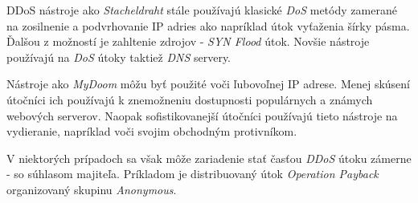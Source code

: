 \documentclass[
  digital, %
  table,   %
  lof,     %
  nolot,   %
  nocover
]{fithesis3}
\begin{document}
DDoS nástroje ako \textit{Stacheldraht} stále používajú klasické \textit{DoS} metódy zamerané na
zosilnenie a podvrhovanie IP adries ako napríklad útok vyťaženia šírky pásma. Ďalšou z možností je
zahltenie zdrojov - \textit{SYN Flood} útok. Novšie nástroje používajú na \textit{DoS} útoky taktiež
\textit{DNS} servery.

Nástroje ako \textit{MyDoom} môžu byť použité voči ľubovoľnej IP adrese. Menej skúsení útočníci ich
používajú k znemožneniu dostupnosti populárnych a známych webových serverov. Naopak sofistikovanejší
útočníci používajú tieto nástroje na vydieranie, napríklad voči svojim obchodným protivníkom.

V niektorých prípadoch sa však môže zariadenie stať časťou \textit{DDoS} útoku zámerne - so súhlasom
majiteľa. Príkladom je distribuovaný útok \textit{Operation Payback} organizovaný skupinu
\textit{Anonymous}.






\end{document}
